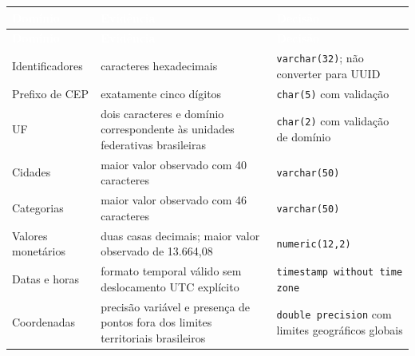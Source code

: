\documentclass[12pt,a4paper]{article}
\begin{document}
	{\small
		\renewcommand{\arraystretch}{1.25}
		
		\begin{longtable}{
				|>{\raggedright\arraybackslash}p{3.3cm}|
				>{\raggedright\arraybackslash}p{5.4cm}|
				>{\raggedright\arraybackslash}p{5.5cm}|
			}
			
			\hline
			
			\rowcolor{AzulCorporativo}
			\textcolor{white}{\textbf{Domínio}}
			&
			\textcolor{white}{\textbf{Evidência}}
			&
			\textcolor{white}{\textbf{Decisão}}
			\\ \hline
			
			\endfirsthead
			
			\hline
			
			\rowcolor{AzulCorporativo}
			\textcolor{white}{\textbf{Domínio}}
			&
			\textcolor{white}{\textbf{Evidência}}
			&
			\textcolor{white}{\textbf{Decisão}}
			\\ \hline
			
			\endhead
			
			Identificadores
			&
			32 caracteres hexadecimais
			&
			\texttt{varchar(32)}; não converter para UUID
			\\ \hline
			
			Prefixo de CEP
			&
			exatamente cinco dígitos
			&
			\texttt{char(5)} com validação
			\\ \hline
			
			UF
			&
			dois caracteres e domínio correspondente às unidades federativas brasileiras
			&
			\texttt{char(2)} com validação de domínio
			\\ \hline
			
			Cidades
			&
			maior valor observado com 40 caracteres
			&
			\texttt{varchar(50)}
			\\ \hline
			
			Categorias
			&
			maior valor observado com 46 caracteres
			&
			\texttt{varchar(50)}
			\\ \hline
			
			Valores monetários
			&
			duas casas decimais; maior valor observado de 13.664,08
			&
			\texttt{numeric(12,2)}
			\\ \hline
			
			Datas e horas
			&
			formato temporal válido sem deslocamento UTC explícito
			&
			\texttt{timestamp without time zone}
			\\ \hline
			
			Coordenadas
			&
			precisão variável e presença de pontos fora dos limites territoriais brasileiros
			&
			\texttt{double precision} com limites geográficos globais
			\\ \hline
			
		\end{longtable}
	}
	
\end{document}
